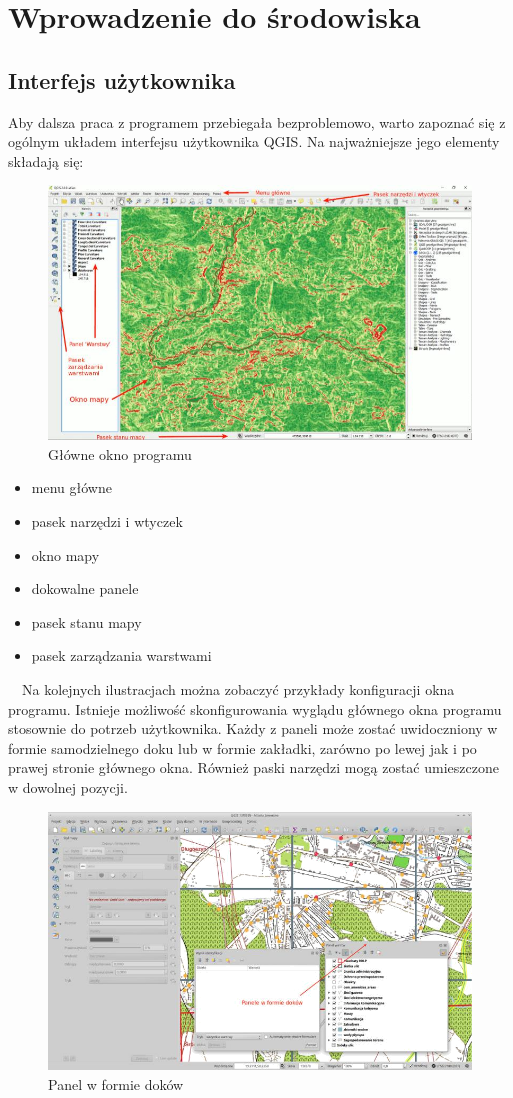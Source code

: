 \documentclass[12pt,a4paper]{book}
\begin{document}
\chapter{Wprowadzenie do środowiska}
\section{Interfejs użytkownika}
Aby dalsza praca z programem przebiegała bezproblemowo, warto zapoznać się z ogólnym układem interfejsu użytkownika QGIS. Na najważniejsze jego elementy składają się:
\begin{figure}[!ht]
	\centering
	\includegraphics[scale=0.45]{001-interfejs.jpg}
	\caption{Główne okno programu}
\end{figure}
\begin{itemize}
\item menu główne
\item pasek narzędzi i wtyczek
\item okno mapy
\item dokowalne panele
\item pasek stanu mapy
\item pasek zarządzania warstwami
\end{itemize}
\ \ Na kolejnych ilustracjach można zobaczyć przykłady konfiguracji okna programu. Istnieje możliwość skonfigurowania wyglądu głównego okna programu stosownie do potrzeb użytkownika. Każdy z paneli może zostać uwidoczniony w formie samodzielnego doku lub w formie zakładki, zarówno po lewej jak i po prawej stronie głównego okna. Również paski narzędzi mogą zostać umieszczone w dowolnej pozycji. 
\begin{figure}[!ht]
	\centering
	\includegraphics[scale=0.45]{001-panele.png}
	\caption{Panel w formie doków}
\end{figure}
\end{document}
